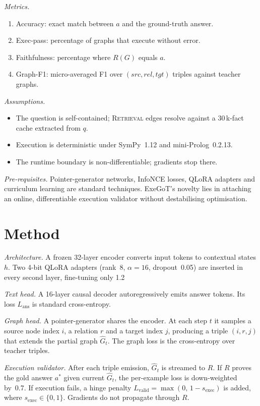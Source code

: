 \documentclass{article} %
\begin{document}
\textit{Metrics.}
\begin{enumerate}
  \item Accuracy: exact match between $a$ and the ground-truth answer.
  \item Exec-pass: percentage of graphs that execute without error.
  \item Faithfulness: percentage where $R(G)$ equals $a$.
  \item Graph-F1: micro-averaged F1 over $(\textit{src}, \textit{rel}, \textit{tgt})$ triples against teacher graphs.
\end{enumerate}

\textit{Assumptions.}
\begin{itemize}
  \item The question is self-contained; \textsc{Retrieval} edges resolve against a 30\,k-fact cache extracted from $q$.
  \item Execution is deterministic under SymPy~1.12 and mini-Prolog~0.2.13.
  \item The runtime boundary is non-differentiable; gradients stop there.
\end{itemize}

\textit{Pre-requisites.} Pointer-generator networks, InfoNCE losses, QLoRA adapters and curriculum learning are standard techniques. ExeGoT’s novelty lies in attaching an online, differentiable execution validator without destabilising optimisation.

\section{Method}
\label{sec:method}
\textit{Architecture.} A frozen 32-layer encoder converts input tokens to contextual states $h$. Two 4-bit QLoRA adapters (rank~8, $\alpha=16$, dropout~0.05) are inserted in every second layer, fine-tuning only 1.2\,%

\textit{Text head.} A 16-layer causal decoder autoregressively emits answer tokens. Its loss $L_{\text{ans}}$ is standard cross-entropy.

\textit{Graph head.} A pointer-generator shares the encoder. At each step $t$ it samples a source node index $i$, a relation $r$ and a target index $j$, producing a triple $(i,r,j)$ that extends the partial graph $\hat{G}_t$. The graph loss is the cross-entropy over teacher triples.

\textit{Execution validator.} After each triple emission, $\hat{G}_t$ is streamed to $R$. If $R$ proves the gold answer $a^{*}$ given current $\hat{G}_t$, the per-example loss is down-weighted by~0.7. If execution fails, a hinge penalty $L_{\text{valid}}=\max(0,\,1-s_{\text{exec}})$ is added, where $s_{\text{exec}}\in\{0,1\}$. Gradients do not propagate through $R$.
\end{document}
